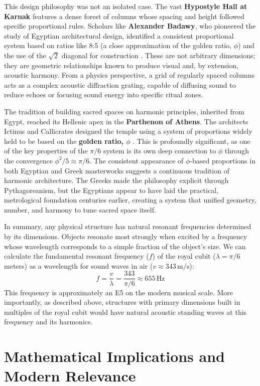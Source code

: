 \documentclass[11pt]{article}
\begin{document}
This design philosophy was not an isolated case. The vast \textbf{Hypostyle Hall at Karnak} features a dense forest of columns whose spacing and height followed specific proportional rules. Scholars like \textbf{Alexander Badawy}, who pioneered the study of Egyptian architectural design, identified a consistent proportional system based on ratios like 8:5 (a close approximation of the golden ratio, $\phi$) and the use of the $\sqrt{2}$ diagonal for construction \cite{badawy1965ancient}. These are not arbitrary dimensions; they are geometric relationships known to produce visual and, by extension, acoustic harmony. From a physics perspective, a grid of regularly spaced columns acts as a complex acoustic diffraction grating, capable of diffusing sound to reduce echoes or focusing sound energy into specific ritual zones.

The tradition of building sacred spaces on harmonic principles, inherited from Egypt, reached its Hellenic apex in the \textbf{Parthenon of Athens}. The architects Ictinus and Callicrates designed the temple using a system of proportions widely held to be based on the \textbf{golden ratio, $\phi$} \cite{vandeventer1978space}. This is profoundly significant, as one of the key properties of the $\pi/6$ system is its own deep connection to $\phi$ through the convergence $\phi^2/5 \approx \pi/6$. The consistent appearance of $\phi$-based proportions in both Egyptian and Greek masterworks suggests a continuous tradition of harmonic architecture. The Greeks made the philosophy explicit through Pythagoreanism, but the Egyptians appear to have laid the practical, metrological foundation centuries earlier, creating a system that unified geometry, number, and harmony to tune sacred space itself.

In summary, any physical structure has natural resonant frequencies determined by its dimensions. Objects resonate most strongly when excited by a frequency whose wavelength corresponds to a simple fraction of the object's size. We can calculate the fundamental resonant frequency ($f$) of the royal cubit ($\lambda = \pi/6$ meters) as a wavelength for sound waves in air ($v \approx 343\,\text{m/s}$):
\[
f = \frac{v}{\lambda} = \frac{343}{\pi/6} \approx 655\,\text{Hz}
\]
This frequency is approximately an E5 on the modern musical scale. More importantly, as described above, structures with primary dimensions built in multiples of the royal cubit would have natural acoustic standing waves at this frequency and its harmonics.


\section{Mathematical Implications and Modern Relevance}
\end{document}
